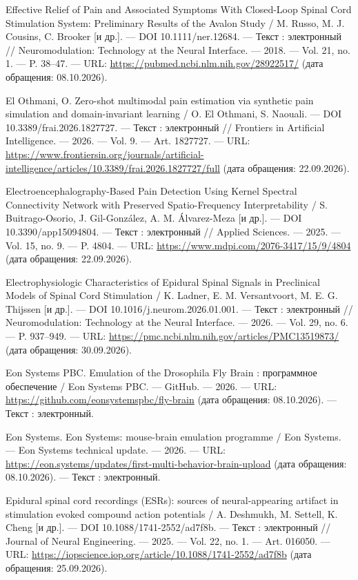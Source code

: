 \begin{list}{}{\setlength{\leftmargin}{10mm}\setlength{\labelwidth}{8mm}\setlength{\labelsep}{2mm}\setlength{\itemsep}{0pt}\setlength{\parsep}{0pt}\setlength{\topsep}{0pt}}
\item[110.] Effective Relief of Pain and Associated Symptoms With Closed-Loop Spinal Cord Stimulation System: Preliminary Results of the Avalon Study / M. Russo, M. J. Cousins, C. Brooker [и др.]. — DOI 10.1111/ner.12684. — Текст : электронный // Neuromodulation: Technology at the Neural Interface. — 2018. — Vol. 21, no. 1. — P. 38–47. — URL: \url{https://pubmed.ncbi.nlm.nih.gov/28922517/} (дата обращения: 08.10.2026).
\item[111.] El Othmani, O. Zero-shot multimodal pain estimation via synthetic pain simulation and domain-invariant learning / O. El Othmani, S. Naouali. — DOI 10.3389/frai.2026.1827727. — Текст : электронный // Frontiers in Artificial Intelligence. — 2026. — Vol. 9. — Art. 1827727. — URL: \url{https://www.frontiersin.org/journals/artificial-intelligence/articles/10.3389/frai.2026.1827727/full} (дата обращения: 22.09.2026).
\item[112.] Electroencephalography-Based Pain Detection Using Kernel Spectral Connectivity Network with Preserved Spatio-Frequency Interpretability / S. Buitrago-Osorio, J. Gil-González, A. M. Álvarez-Meza [и др.]. — DOI 10.3390/app15094804. — Текст : электронный // Applied Sciences. — 2025. — Vol. 15, no. 9. — P. 4804. — URL: \url{https://www.mdpi.com/2076-3417/15/9/4804} (дата обращения: 22.09.2026).
\item[113.] Electrophysiologic Characteristics of Epidural Spinal Signals in Preclinical Models of Spinal Cord Stimulation / K. Ladner, E. M. Versantvoort, M. E. G. Thijssen [и др.]. — DOI 10.1016/j.neurom.2026.01.001. — Текст : электронный // Neuromodulation: Technology at the Neural Interface. — 2026. — Vol. 29, no. 6. — P. 937–949. — URL: \url{https://pmc.ncbi.nlm.nih.gov/articles/PMC13519873/} (дата обращения: 30.09.2026).
\item[114.] Eon Systems PBC. Emulation of the Drosophila Fly Brain : программное обеспечение / Eon Systems PBC. — GitHub. — 2026. — URL: \url{https://github.com/eonsystemspbc/fly-brain} (дата обращения: 08.10.2026). — Текст : электронный.
\item[115.] Eon Systems. Eon Systems: mouse-brain emulation programme / Eon Systems. — Eon Systems technical update. — 2026. — URL: \url{https://eon.systems/updates/first-multi-behavior-brain-upload} (дата обращения: 08.10.2026). — Текст : электронный.
\item[116.] Epidural spinal cord recordings (ESRs): sources of neural-appearing artifact in stimulation evoked compound action potentials / A. Deshmukh, M. Settell, K. Cheng [и др.]. — DOI 10.1088/1741-2552/ad7f8b. — Текст : электронный // Journal of Neural Engineering. — 2025. — Vol. 22, no. 1. — Art. 016050. — URL: \url{https://iopscience.iop.org/article/10.1088/1741-2552/ad7f8b} (дата обращения: 25.09.2026).

\end{list}
